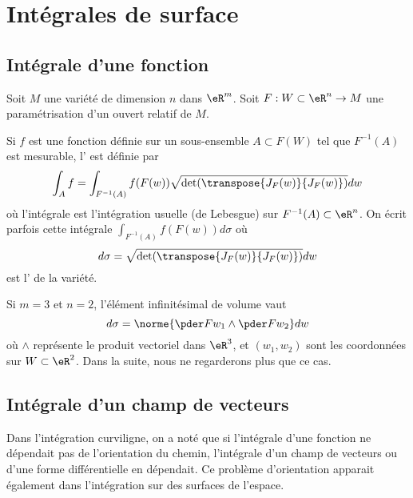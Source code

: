 
\section{Intégrales de surface}

\subsection{Intégrale d'une fonction}
\label{secintsurfaciques}
Soit $M$ une variété de dimension $n$ dans $\eR^m$. Soit $F : W \subset \eR^n \to M$ une paramétrisation d'un ouvert relatif de $M$.  

Si $f$ est une fonction définie sur un sous-ensemble $A \subset F(W)$ tel que $F^{-1}(A)$ est mesurable, l' est définie par
\begin{equation*}
  \int_A f = \int_{F^{-1}(A)} f(F(w)) \sqrt{\det(\transpose{J_F(w)} {J_F(w)})} dw
\end{equation*}
où l'intégrale est l'intégration usuelle (de Lebesgue) sur $F^{-1}(A) \subset \eR^n$. On écrit parfois cette intégrale $\int_{F^{-1}(A)} f(F(w)) d\sigma$ où
\begin{equation*}
  d\sigma = \sqrt{\det(\transpose{J_F(w)} {J_F(w)})} dw
\end{equation*}
est l' de la variété. 

Si $m = 3$ et $n = 2$, l'élément infinitésimal de volume vaut
\begin{equation*}
  d \sigma = \norme{\pder F {w_1} \wedge \pder F {w_2}} dw
\end{equation*}
où $\wedge$ représente le produit vectoriel dans $\eR^3$, et $(w_1,w_2)$ sont les coordonnées sur $W \subset \eR^2$. Dans la suite, nous ne regarderons plus que ce cas.

\subsection{Intégrale d'un champ de vecteurs}
Dans l'intégration curviligne, on a noté que si l'intégrale d'une fonction ne dépendait pas de l'orientation du chemin, l'intégrale d'un champ de vecteurs ou d'une forme différentielle en dépendait. Ce problème d'orientation apparait également dans l'intégration sur des surfaces de l'espace.

